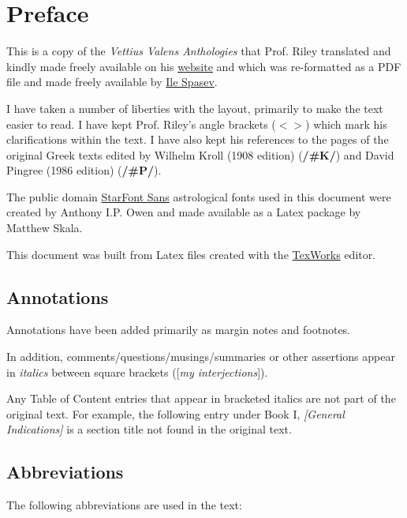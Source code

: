 \chapter{Preface}
This is a copy of the \textit{Vettius Valens Anthologies} that Prof. Riley translated and kindly made freely available on his \href{https://www.csus.edu/indiv/r/rileymt/}{website} and which was re-formatted as a PDF file and made freely available by \href{https://beyondtheheaven.files.wordpress.com/2019/02/valens-atnhologies-1st-ed.-green.pdf}{Ile Spasev}.

I have taken a number of liberties with the layout, primarily to make the text easier to read. I have kept Prof. Riley's angle brackets ($<>$) which mark his clarifications within the text. I have also kept his references to the pages of the original Greek texts edited by Wilhelm Kroll (1908 edition) (\textbf{/\#K/}) and David Pingree (1986 edition) (\textbf{/\#P/}). 

The public domain \href{https://www.ctan.org/pkg/starfont}{StarFont Sans} astrological fonts used in this document were created by Anthony I.P. Owen and made available as a Latex package by Matthew Skala. 

This document was built from Latex files created with the \href{https://www.tug.org/texworks/}{TexWorks} editor.

\section{Annotations}

Annotations have been added primarily as margin notes and footnotes. 

In addition, comments/questions/musings/summaries or other assertions appear in \textit{italics} between square brackets ([\textit{my interjections}]). 

Any Table of Content entries that appear in bracketed italics are not part of the original text. For example, the following entry under Book I, \textit{[General Indications]} is a section title not found in the original text.

\section{Abbreviations}
The following abbreviations are used in the text:

